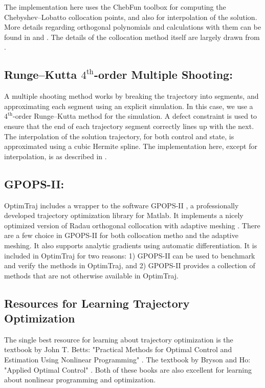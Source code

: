 \par The implementation here uses the ChebFun toolbox \cite{Driscoll2014} for computing the Chebyshev--Lobatto collocation points, and also for interpolation of the solution. More details regarding orthogonal polynomials and calculations with them can be found in \cite{Berrut2004a} and \cite{Trefethen2012}. The details of the collocation method itself are largely drawn from \cite{Vlassenbroeck1988}.

\subsection{Runge--Kutta $4^\text{th}$-order Multiple Shooting:  }

A multiple shooting method works by breaking the trajectory into segments, and approximating each segment using an explicit simulation. In this case, we use a $4^\text{th}$-order Runge--Kutta method for the simulation. A defect constraint is used to ensure that the end of each trajectory segment correctly lines up with the next. The interpolation of the solution trajectory, for both control and state, is approximated using a cubic Hermite spline. The implementation here, except for interpolation, is as described in \cite{Betts2010}.

\subsection{GPOPS-II:    }

OptimTraj includes a wrapper to the software GPOPS-II \cite{Patterson2013}, a professionally developed trajectory optimization library for Matlab. It implements a nicely optimized version of Radau orthogonal collocation with adaptive meshing \cite{Darby2011a}. There are a few choice in GPOPS-II for both collocation metho and the adaptive meshing. It also supports analytic gradients using automatic differentiation. It is included in OptimTraj for two reasons: 1) GPOPS-II can be used to benchmark and verify the methods in OptimTraj, and 2) GPOPS-II provides a collection of methods that are not otherwise available in OptimTraj.

\subsection{Resources for Learning Trajectory Optimization}

The single best resource for learning about trajectory optimization is the textbook by John T. Betts: "Practical Methods for Optimal Control and Estimation Using Nonlinear Programming" \cite{Betts2010}. The textbook by Bryson and Ho: "Applied Optimal Control" \cite{Bryson1975}. Both of these books are also excellent for learning about nonlinear programming and optimization.\\

